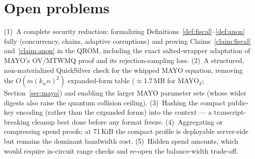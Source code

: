 \documentclass[11pt]{article}
\begin{document}
\section{Open problems}
\label{sec:open}

(1)~A complete security reduction: formalizing
Definitions~\ref{def:fiscal}--\ref{def:anon} fully (concurrency, chains,
adaptive corruptions) and proving Claims~\ref{claim:fiscal}
and~\ref{claim:anon} in the QROM, including the exact salted-wrapper
adaptation of MAYO's OV/MTWMQ proof and its rejection-sampling loss.
(2)~A structured, non-materialized QuickSilver check for the whipped MAYO
equation, removing the $O(m (k_w n)^2)$ expanded-form table
($\approx$1.7\,MB for MAYO$_2$; Section~\ref{sec:mayo}) and enabling the
larger MAYO parameter sets (whose wider digests also raise the quantum
collision ceiling).
(3)~Hashing the compact public-key encoding (rather than the expanded forms)
into the context --- a transcript-breaking cleanup best done before any
format freeze.
(4)~Aggregating or compressing spend proofs; at 71\,KiB the compact profile
is deployable server-side but remains the dominant bandwidth cost.
(5)~Hidden spend amounts, which would require in-circuit range checks and
re-open the balance-width trade-off.
\end{document}
